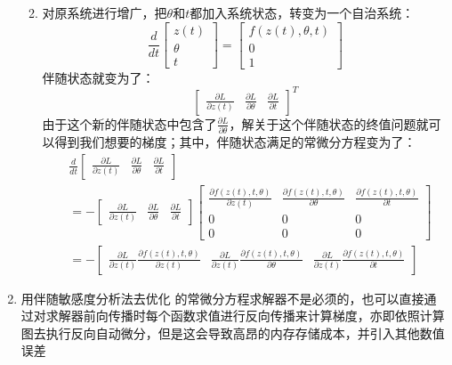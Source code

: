 \documentclass[11pt]{article}
\begin{document}
\begin{enumerate}
\begin{enumerate}
\[\]
\item 对原系统进行增广，把$\theta$和$t$都加入系统状态，转变为一个自治系统：\[
\frac{d}{dt}
\begin{bmatrix}
z(t)\\
\theta\\
t
\end{bmatrix}
=
\begin{bmatrix}
f(z(t),\theta,t)\\
0\\
1
\end{bmatrix}
\]伴随状态就变为了：\[
\begin{bmatrix}
\frac{\partial L}{\partial z(t)}&\frac{\partial L}{\partial\theta}&\frac{\partial L}{\partial t}
\end{bmatrix}^T
\]由于这个新的伴随状态中包含了$\frac{\partial L}{\partial\theta}$，解关于这个伴随状态的终值问题就可以得到我们想要的梯度；其中，伴随状态满足的常微分方程变为了：\[
\begin{split}
&\frac{d}{dt}
\begin{bmatrix}
\frac{\partial L}{\partial z(t)}&\frac{\partial L}{\partial\theta}&\frac{\partial L}{\partial t}
\end{bmatrix}\\
&=-\begin{bmatrix}
\frac{\partial L}{\partial z(t)}&\frac{\partial L}{\partial\theta}&\frac{\partial L}{\partial t}
\end{bmatrix}\begin{bmatrix}
\frac{\partial f(z(t),t,\theta)}{\partial z(t)}&\frac{\partial f(z(t),t,\theta)}{\partial\theta}&\frac{\partial f(z(t),t,\theta)}{\partial t}\\
0&0&0\\
0&0&0
\end{bmatrix}\\
&=-\begin{bmatrix}
\frac{\partial L}{\partial z(t)}\frac{\partial f(z(t),t,\theta)}{\partial z(t)}&\frac{\partial L}{\partial z(t)}\frac{\partial f(z(t),t,\theta)}{\partial\theta}&\frac{\partial L}{\partial z(t)}\frac{\partial f(z(t),t,\theta)}{\partial t}
\end{bmatrix}
\end{split}
\]
\end{enumerate}
\item 用伴随敏感度分析法去优化 \cite{DBLP:journals/corr/abs-1806-07366} 的常微分方程求解器不是必须的，也可以直接通过对求解器前向传播时每个函数求值进行反向传播来计算梯度，亦即依照计算图去执行反向自动微分，但是这会导致高昂的内存存储成本，并引入其他数值误差

\end{enumerate}
\end{document}
